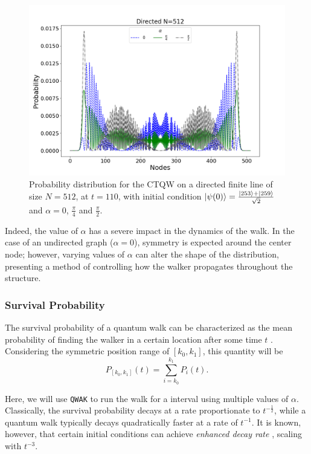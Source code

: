 \documentclass[main.tex]{subfiles}
\begin{document}
\begin{figure}[!h]
    \centering
    \includegraphics[scale=\mysinglefigurescale]{img/QWAK/OrientedDynamics/orDynN512NW3Alpha0.79-1.57TMAX110.png}
    \caption{Probability distribution for the CTQW on a 
        directed finite line of size $N=512$, at $t=110$, with initial condition  $\ket{\psi(0)}=\frac{\ket{253}+\ket{259}}{\sqrt{2}}$
    and $\alpha = 0$, $\frac{\pi}{4}$ and $\frac{\pi}{2}$.}
    \label{fig:multipleAlphaOrientedDynamics}
\end{figure}

Indeed, the value of $\alpha$ has a severe impact in the dynamics of the walk.
In the case of an undirected graph ($\alpha = 0$), symmetry is expected around
the center node; however, varying values of $\alpha$ can alter the shape of the
distribution, presenting a method of controlling how the walker propagates
throughout the structure.

\subsubsection{Survival Probability}
The survival probability of a quantum walk can be characterized as the mean
probability of finding the walker in a certain location after some time $t$
\cite{Goenuelol2011}. Considering the symmetric position range of $[k_0,k_1]$, this
quantity will be
\begin{equation}
    P_{[k_0,k_1]}(t)=\sum_{i=k_0}^{k_1} P_{i}(t).
\end{equation}

Here, we will use \texttt{QWAK} to run the walk for a interval using multiple
values of $\alpha$. Classically, the survival probability decays at a rate
proportionate to $t^{-\frac{1}{2}}$, while a quantum walk typically decays
quadratically faster at a rate of $t^{-1}$. It is known, however, that certain
initial conditions can achieve \textit{enhanced decay rate}
\cite{abalEffects06}, scaling with $t^{-3}$.\par
\end{document}
